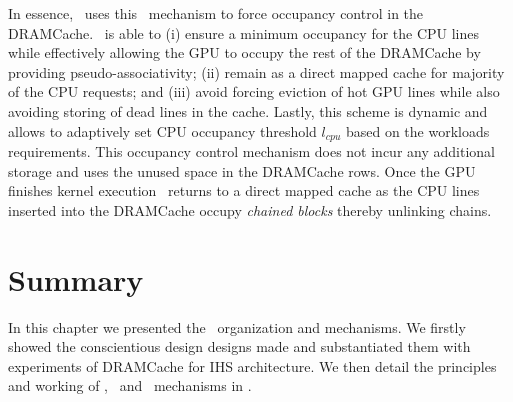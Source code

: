 \par In essence, \cachename\ uses this \chaining\ mechanism to force occupancy control in the DRAMCache. \chaining\ is able to 
(i) ensure a minimum occupancy for the CPU lines while effectively allowing the GPU to occupy the rest of the DRAMCache by providing pseudo-associativity;
(ii) remain as a direct mapped cache for majority of the CPU requests; and
(iii) avoid forcing eviction of hot GPU lines while also avoiding storing of dead lines in the cache.
Lastly, this scheme is dynamic and allows to adaptively set CPU occupancy threshold \textit{$l_{cpu}$} based on the workloads requirements. This occupancy control mechanism does not incur any additional storage and uses the unused space in the DRAMCache rows. Once the GPU finishes kernel execution \cachename\ returns to a direct mapped cache as the CPU lines inserted into the DRAMCache occupy \textit{chained blocks} thereby unlinking chains. 

\section{Summary}
In this chapter we presented the \cachename\ organization and mechanisms. We firstly showed the conscientious design designs made and substantiated them with experiments of DRAMCache for IHS architecture. We then detail the principles and working of \prioname, \bypassname\ and \chaining\ mechanisms in \cachename.


